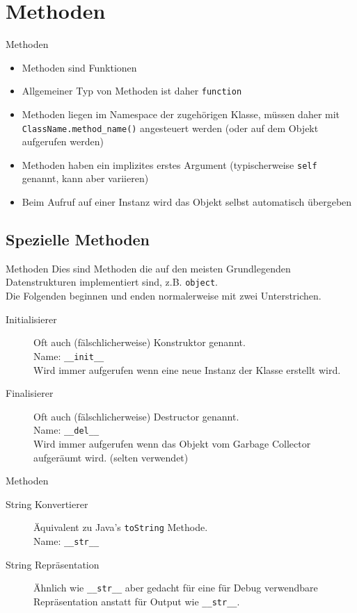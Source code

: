 \section{Methoden}
\begin{frame}[fragile]{Methoden}
	\begin{itemize}
		\item Methoden sind Funktionen
		\item Allgemeiner Typ von Methoden ist daher \alert{\texttt{function}}
		\item Methoden liegen im Namespace der zugehörigen Klasse, müssen daher mit \alert{\texttt{ClassName.method\_name()}} angesteuert werden (oder auf dem Objekt aufgerufen werden)
		\item Methoden haben ein implizites erstes Argument (typischerweise \texttt{self} genannt, kann aber variieren)
		\item Beim Aufruf auf einer Instanz wird das Objekt selbst automatisch übergeben
	\end{itemize}
\end{frame}


\subsection{Spezielle Methoden}
\begin{frame}[fragile]{Methoden}
	Dies sind Methoden die auf den meisten Grundlegenden Datenstrukturen implementiert sind, z.B. \texttt{object}.\\
	Die Folgenden beginnen und enden normalerweise mit zwei Unterstrichen.

	\begin{description}
		\item[Initialisierer] Oft auch (fälschlicherweise) Konstruktor genannt.\\ Name: \alert{\texttt{\_\_init\_\_}}\\
			Wird immer aufgerufen wenn eine neue Instanz der Klasse erstellt wird.
		\item[Finalisierer] Oft auch (fälschlicherweise) Destructor genannt.\\
			Name: \alert{\texttt{\_\_del\_\_}}\\
			Wird immer aufgerufen wenn das Objekt vom Garbage Collector aufgeräumt wird. (selten verwendet)
	\end{description}
\end{frame}

\begin{frame}[fragile]{Methoden}
    \begin{description}
		\item[String Konvertierer] Äquivalent zu Java's \texttt{toString} Methode. \\ Name: \alert{\texttt{\_\_str\_\_}}
		\item[String Repräsentation] Ähnlich wie \alert{\texttt{\_\_str\_\_}} aber gedacht für eine für Debug verwendbare Repräsentation anstatt für Output wie \alert{\texttt{\_\_str\_\_}}.
	\end{description}
\end{frame}

